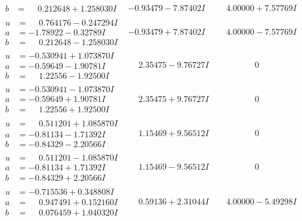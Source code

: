 \documentclass[1p]{elsarticle_modified}
\theoremstyle{definition}
\begin{document}
$$\begin{array}{c|c|c}
\begin{aligned}
b &= \phantom{-}0.212648 + 1.258030 I\end{aligned}
 & -0.93479 - 7.87402 I & \phantom{-}4.00000 + 7.57769 I \\ \hline\begin{aligned}
u &= \phantom{-}0.764176 - 0.247294 I \\
a &= -1.78922 - 0.32789 I \\
b &= \phantom{-}0.212648 - 1.258030 I\end{aligned}
 & -0.93479 + 7.87402 I & \phantom{-}4.00000 - 7.57769 I \\ \hline\begin{aligned}
u &= -0.530941 + 1.073870 I \\
a &= -0.59649 - 1.90781 I \\
b &= \phantom{-}1.22556 - 1.92500 I\end{aligned}
 & \phantom{-}2.35475 - 9.76727 I & \phantom{-0.000000 } 0 \\ \hline\begin{aligned}
u &= -0.530941 - 1.073870 I \\
a &= -0.59649 + 1.90781 I \\
b &= \phantom{-}1.22556 + 1.92500 I\end{aligned}
 & \phantom{-}2.35475 + 9.76727 I & \phantom{-0.000000 } 0 \\ \hline\begin{aligned}
u &= \phantom{-}0.511201 + 1.085870 I \\
a &= -0.81134 - 1.71392 I \\
b &= -0.84329 - 2.20566 I\end{aligned}
 & \phantom{-}1.15469 + 9.56512 I & \phantom{-0.000000 } 0 \\ \hline\begin{aligned}
u &= \phantom{-}0.511201 - 1.085870 I \\
a &= -0.81134 + 1.71392 I \\
b &= -0.84329 + 2.20566 I\end{aligned}
 & \phantom{-}1.15469 - 9.56512 I & \phantom{-0.000000 } 0 \\ \hline\begin{aligned}
u &= -0.715536 + 0.348808 I \\
a &= \phantom{-}0.947491 + 0.152160 I \\
b &= \phantom{-}0.076459 + 1.040320 I\end{aligned}
 & \phantom{-}0.59136 + 2.31044 I & \phantom{-}4.00000 - 5.49298 I \\ \hline\begin{aligned}

\end{aligned}
\end{array}$$
\end{document}
